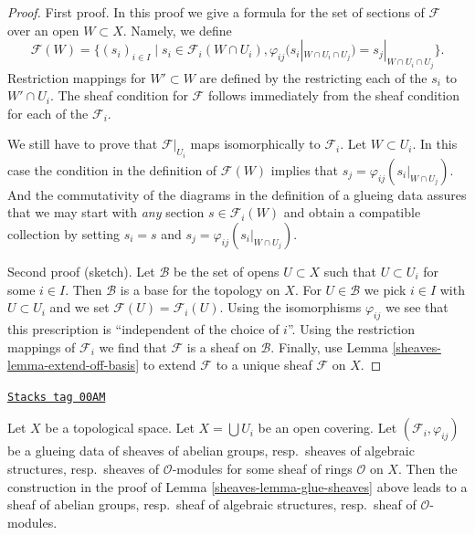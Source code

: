 \begin{proof}

First proof. In this proof we give a formula for the set of sections
of $\mathcal{F}$ over an open $W \subset X$. Namely, we define
$$
\mathcal{F}(W) =
\{
(s_i)_{i \in I} \mid
s_i \in \mathcal{F}_i(W \cap U_i),
\varphi_{ij}(s_i|_{W \cap U_i \cap U_j}) = s_j|_{W \cap U_i \cap U_j}
\}.
$$
Restriction mappings for $W' \subset W$ are defined by the restricting
each of the $s_i$ to $W' \cap U_i$. The sheaf condition for $\mathcal{F}$
follows immediately from the sheaf condition for each of the
$\mathcal{F}_i$.

\medskip\noindent
We still have to prove that $\mathcal{F}|_{U_i}$ maps
isomorphically to $\mathcal{F}_i$. Let $W \subset U_i$.
In this case the condition in the definition of
$\mathcal{F}(W)$ implies that $s_j = \varphi_{ij}(s_i|_{W \cap U_j})$.
And the commutativity of the diagrams in the definition
of a glueing data assures that we may start with {\it any}
section $s \in \mathcal{F}_i(W)$ and obtain a compatible
collection by setting $s_i = s$ and $s_j = \varphi_{ij}(s_i|_{W \cap U_j})$.

\medskip\noindent
Second proof (sketch). Let $\mathcal{B}$ be the set of opens $U \subset X$
such that $U \subset U_i$ for some $i \in I$. Then $\mathcal{B}$
is a base for the topology on $X$. For $U \in \mathcal{B}$ we pick
$i \in I$ with $U \subset U_i$ and we set $\mathcal{F}(U) = \mathcal{F}_i(U)$.
Using the isomorphisms $\varphi_{ij}$ we see that this prescription
is ``independent of the choice of $i$''. Using the restriction mappings
of $\mathcal{F}_i$ we find that $\mathcal{F}$ is a sheaf on $\mathcal{B}$.
Finally, use Lemma \ref{sheaves-lemma-extend-off-basis} to extend $\mathcal{F}$
to a unique sheaf $\mathcal{F}$ on $X$.
\end{proof}

\begin{lemma}
\label{sheaves-lemma-glue-sheaves-structures}
\href{https://stacks.math.columbia.edu/tag/00AM}{\texttt{Stacks tag 00AM}}

Let $X$ be a topological space.
Let $X = \bigcup U_i$ be an open covering.
Let $(\mathcal{F}_i, \varphi_{ij})$ be a glueing data
of sheaves of abelian groups, resp.\ sheaves of algebraic structures,
resp.\ sheaves of $\mathcal{O}$-modules for some sheaf of rings
$\mathcal{O}$ on $X$. Then the construction in the proof of
Lemma \ref{sheaves-lemma-glue-sheaves} above leads to a sheaf
of abelian groups, resp.\ sheaf of algebraic structures,
resp.\ sheaf of $\mathcal{O}$-modules.
\end{lemma}

